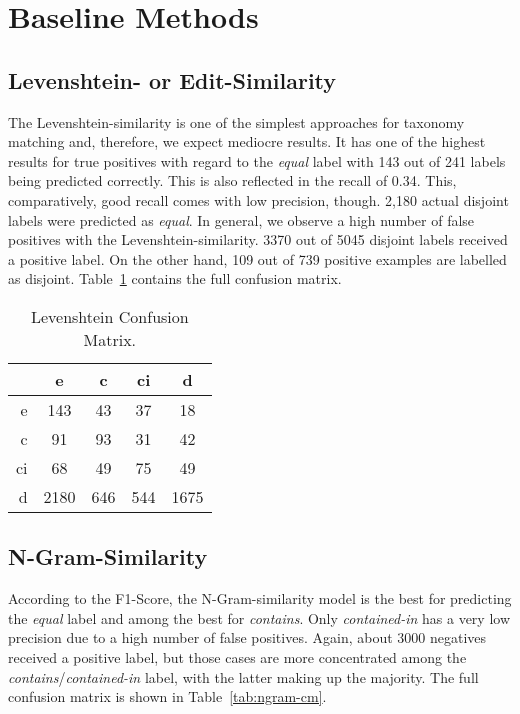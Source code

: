 \section{Baseline Methods}

\subsection{Levenshtein- or Edit-Similarity}

The Levenshtein-similarity is one of the simplest approaches for taxonomy matching and, therefore, we expect
mediocre results.
It has one of the highest results for true positives with regard to the \emph{equal} label with 143 out of 241 labels being
predicted correctly.
This is also reflected in the recall of 0.34.
This, comparatively, good recall comes with low precision, though.
2,180 actual disjoint labels were predicted as \emph{equal}.
In general, we observe a high number of false positives with the  Levenshtein-similarity.
3370 out of 5045 disjoint labels received a positive label.
On the other hand, 109 out  of 739 positive examples are labelled as disjoint.
Table~\ref{tab:levenshtein-cm} contains the  full confusion matrix.

\begin{table}[htbp]
 \begin{center}
  \begin{tabular}{r|cccc}
     & e & c & ci & d \\
     \hline
     e & 143 & 43 & 37 & 18 \\
     c & 91 & 93 & 31 & 42 \\
     ci & 68 & 49 & 75 & 49 \\
     d & 2180 & 646 & 544 & 1675 \\
  \end{tabular}
  \caption{Levenshtein Confusion Matrix.}
  \label{tab:levenshtein-cm}
 \end{center}
\end{table}

\subsection{N-Gram-Similarity}

According to the F1-Score, the N-Gram-similarity model is the best for predicting the \emph{equal} label and among the best for
\emph{contains}.
Only \emph{contained-in} has a very low precision due to a high number of false positives.
Again, about 3000 negatives received a positive label, but those cases are more concentrated among the \emph{contains}/\emph{contained-in}
label, with the latter making up the majority.
The full confusion matrix is shown in Table~\ref{tab:ngram-cm}.

